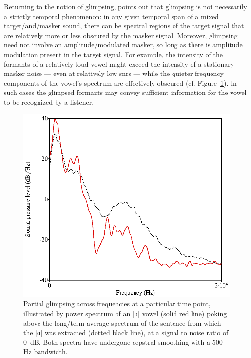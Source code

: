 Returning to the notion of glimpsing, \citet{Cooke2006} points out that glimpsing is not necessarily a strictly temporal phenomenon: in any given temporal span of a mixed target\-/and\-/masker sound, there can be spectral regions of the target signal that are relatively more or less obscured by the masker signal.  Moreover, glimpsing need not involve an amplitude\-/modulated masker, so long as there is amplitude modulation present in the target signal.  For example, the intensity of the formants of a relatively loud vowel might exceed the intensity of a stationary masker noise — even at relatively low \ac{snr}s — while the quieter frequency components of the vowel’s spectrum are effectively obscured (cf. Figure~\ref{fig:PartialGlimpsing}).  In such cases the glimpsed formants may convey sufficient information for the vowel to be recognized by a listener.  %

\begin{figure}[htbp]
	\begin{centering}
	\includegraphics{figures/partialGlimpsing.eps}
	\caption[Partial glimpsing across frequencies at a particular time point]{Partial glimpsing across frequencies at a particular time point, illustrated by power spectrum of an [ɑ] vowel (solid red line) poking above the long\-/term average spectrum of the sentence from which the [ɑ] was extracted (dotted black line), at a signal to noise ratio of 0~dB. Both spectra have undergone cepstral smoothing with a 500 Hz bandwidth.\label{fig:PartialGlimpsing}}
	\end{centering}
\end{figure}

